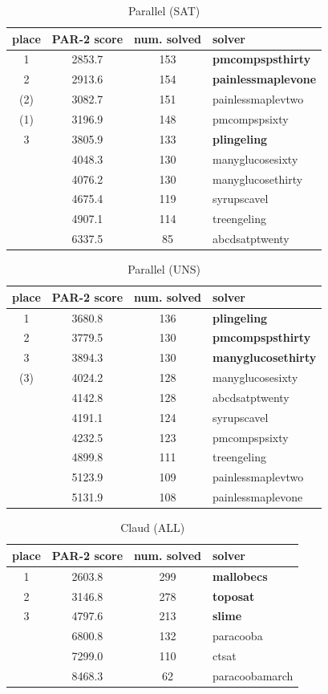 \documentclass{elsarticle}
\begin{document}
\begin{table}
\caption{Parallel (SAT)}
\label{tab:parallelSAT}
\begin{tabular}{cccl}
place & PAR-2 score & num. solved & solver \\
\hline
 1 & 2853.7 & 153 & {\bf pmcompspsthirty} \\
 2 & 2913.6 & 154 & {\bf painlessmaplevone} \\
(2)& 3082.7 & 151 & painlessmaplevtwo \\
(1)& 3196.9 & 148 & pmcompspsixty \\
 3 & 3805.9 & 133 & {\bf plingeling} \\
   & 4048.3 & 130 & manyglucosesixty \\
   & 4076.2 & 130 & manyglucosethirty \\
   & 4675.4 & 119 & syrupscavel \\
   & 4907.1 & 114 & treengeling \\
   & 6337.5 & \phantom{0}85 & abcdsatptwenty \\
\end{tabular}
\end{table}

\begin{table}
\caption{Parallel (UNS)}
\label{tab:parallelUNS}
\begin{tabular}{cccl}
place & PAR-2 score & num. solved & solver \\
\hline
 1 & 3680.8 & 136 & {\bf plingeling} \\
 2 & 3779.5 & 130 & {\bf pmcompspsthirty} \\
 3 & 3894.3 & 130 & {\bf manyglucosethirty} \\
(3)& 4024.2 & 128 & manyglucosesixty \\
   & 4142.8 & 128 & abcdsatptwenty \\
   & 4191.1 & 124 & syrupscavel \\
   & 4232.5 & 123 & pmcompspsixty \\
   & 4899.8 & 111 & treengeling \\
   & 5123.9 & 109 & painlessmaplevtwo \\
   & 5131.9 & 108 & painlessmaplevone \\
\end{tabular}
\end{table}


\begin{table}
\caption{Claud (ALL)}
\label{tab:claud}
\begin{tabular}{cccl}
place & PAR-2 score & num. solved & solver \\
\hline
 1 & 2603.8 & 299 & {\bf mallobecs} \\
 2 & 3146.8 & 278 & {\bf toposat} \\
 3 & 4797.6 & 213 & {\bf slime} \\
   & 6800.8 & 132 & paracooba \\
   & 7299.0 & 110 & ctsat \\
   & 8468.3 & \phantom{0}62 & paracoobamarch \\
\end{tabular}
\end{table}
\end{document}
